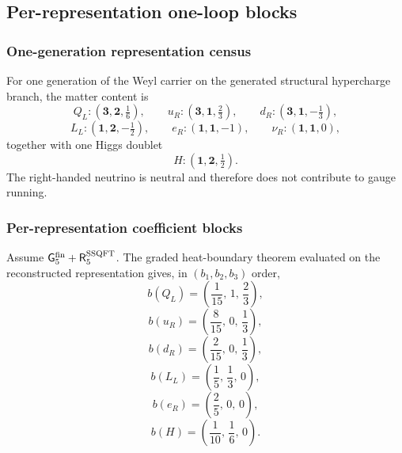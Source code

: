\documentclass[11pt,a4paper]{article}
\begin{document}
\subsection{Per-representation one-loop blocks}
\label{p5:sec:part4-representation-blocks}

\subsubsection{One-generation representation census}
For one generation of the Weyl carrier on the generated structural hypercharge branch, the
matter content is
\[
Q_L:(\mathbf 3,\mathbf 2,\tfrac16),\qquad u_R:(\mathbf 3,\mathbf 1,\tfrac23),\qquad d_R:(\mathbf 3,\mathbf 1,-\tfrac13),
\]
\[
L_L:(\mathbf 1,\mathbf 2,-\tfrac12),\qquad e_R:(\mathbf 1,\mathbf 1,-1),\qquad \nu_R:(\mathbf 1,\mathbf 1,0),
\]
together with one Higgs doublet
\[
H:(\mathbf 1,\mathbf 2,\tfrac12).
\]
The right-handed neutrino is neutral and therefore does not contribute to gauge running.

\subsubsection{Per-representation coefficient blocks}
\begin{proposition}
\label{p5:prop:part4-representation-blocks}
Assume
\(\mathsf G_5^{\rm fin}
+\mathsf R_5^{\rm SSQFT}\).  The graded heat-boundary theorem evaluated on the
reconstructed representation gives, in \((b_1,b_2,b_3)\) order,
\begin{equation}
\label{p5:eq:part4-bQL}
b(Q_L)=\left(\frac{1}{15},\,1,\,\frac23\right),
\end{equation}
\begin{equation}
\label{p5:eq:part4-buR}
b(u_R)=\left(\frac{8}{15},\,0,\,\frac13\right),
\end{equation}
\begin{equation}
\label{p5:eq:part4-bdR}
b(d_R)=\left(\frac{2}{15},\,0,\,\frac13\right),
\end{equation}
\begin{equation}
\label{p5:eq:part4-bLL}
b(L_L)=\left(\frac15,\,\frac13,\,0\right),
\end{equation}
\begin{equation}
\label{p5:eq:part4-beR}
b(e_R)=\left(\frac25,\,0,\,0\right),
\end{equation}
\begin{equation}
\label{p5:eq:part4-bH}
b(H)=\left(\frac{1}{10},\,\frac16,\,0\right).
\end{equation}
\end{proposition}
\end{document}
